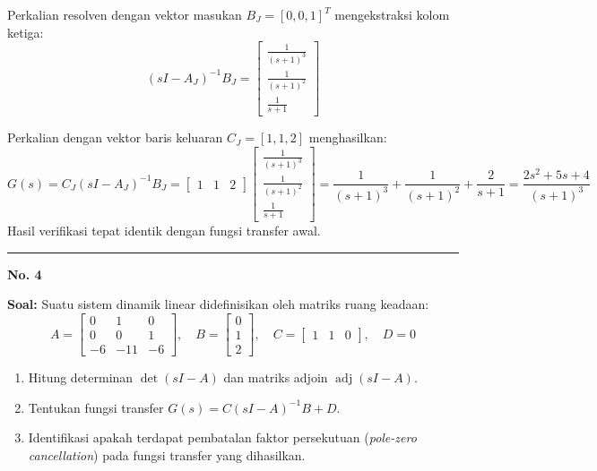 \documentclass[11pt,a4paper]{article}
\begin{document}
Perkalian resolven dengan vektor masukan $B_J = [0, 0, 1]^T$ mengekstraksi kolom ketiga:
$$(sI - A_J)^{-1} B_J = \begin{bmatrix} \frac{1}{(s+1)^3} \\ \frac{1}{(s+1)^2} \\ \frac{1}{s+1} \end{bmatrix}$$

Perkalian dengan vektor baris keluaran $C_J = [1, 1, 2]$ menghasilkan:
$$G(s) = C_J (sI - A_J)^{-1} B_J = \begin{bmatrix} 1 & 1 & 2 \end{bmatrix} \begin{bmatrix} \frac{1}{(s+1)^3} \\ \frac{1}{(s+1)^2} \\ \frac{1}{s+1} \end{bmatrix} = \frac{1}{(s+1)^3} + \frac{1}{(s+1)^2} + \frac{2}{s+1} = \frac{2s^2 + 5s + 4}{(s+1)^3}$$
Hasil verifikasi tepat identik dengan fungsi transfer awal.

\vspace{12pt}
\hrule
\vspace{10pt}

\textbf{\large No. 4}

\textbf{Soal:}  
Suatu sistem dinamik linear didefinisikan oleh matriks ruang keadaan:
$$A = \begin{bmatrix} 0 & 1 & 0 \\ 0 & 0 & 1 \\ -6 & -11 & -6 \end{bmatrix}, \quad B = \begin{bmatrix} 0 \\ 1 \\ 2 \end{bmatrix}, \quad C = \begin{bmatrix} 1 & 1 & 0 \end{bmatrix}, \quad D = 0$$
\begin{enumerate}[label=(\alph*)]
    \item Hitung determinan $\det(sI - A)$ dan matriks adjoin $\operatorname{adj}(sI - A)$.
    \item Tentukan fungsi transfer $G(s) = C(sI - A)^{-1} B + D$.
    \item Identifikasi apakah terdapat pembatalan faktor persekutuan (\textit{pole-zero cancellation}) pada fungsi transfer yang dihasilkan.
\end{enumerate}
\end{document}
